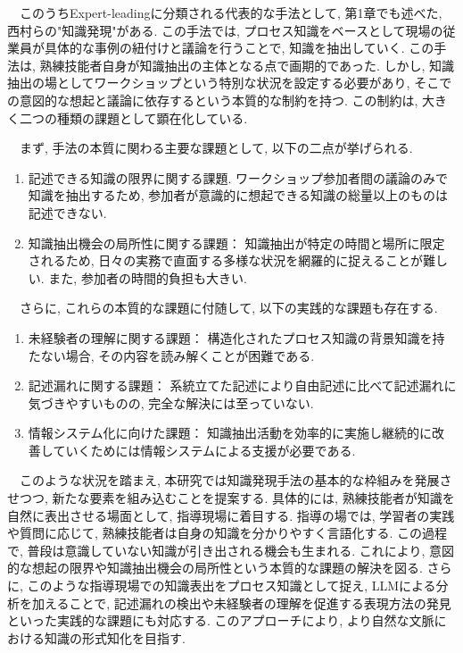 　このうちExpert-leadingに分類される代表的な手法として, 第1章でも述べた, 西村らの"知識発現"\cite{Nishimura2017}がある. この手法では, プロセス知識をベースとして現場の従業員が具体的な事例の紐付けと議論を行うことで, 知識を抽出していく. この手法は, 熟練技能者自身が知識抽出の主体となる点で画期的であった. しかし, 知識抽出の場としてワークショップという特別な状況を設定する必要があり, そこでの意図的な想起と議論に依存するという本質的な制約を持つ. この制約は, 大きく二つの種類の課題として顕在化している. 

　まず, 手法の本質に関わる主要な課題として, 以下の二点が挙げられる.

\begin{enumerate}
    \item 記述できる知識の限界に関する課題.
    ワークショップ参加者間の議論のみで知識を抽出するため, 参加者が意識的に想起できる知識の総量以上のものは記述できない. 
    
    \item 知識抽出機会の局所性に関する課題：
    知識抽出が特定の時間と場所に限定されるため, 日々の実務で直面する多様な状況を網羅的に捉えることが難しい. また, 参加者の時間的負担も大きい.
\end{enumerate}

　さらに, これらの本質的な課題に付随して, 以下の実践的な課題も存在する.

\begin{enumerate}
    \item 未経験者の理解に関する課題：
    構造化されたプロセス知識の背景知識を持たない場合, その内容を読み解くことが困難である. 
    
    \item 記述漏れに関する課題：
    系統立てた記述により自由記述に比べて記述漏れに気づきやすいものの, 完全な解決には至っていない. 
    
    \item 情報システム化に向けた課題：
    知識抽出活動を効率的に実施し継続的に改善していくためには情報システムによる支援が必要である. 
\end{enumerate}

　このような状況を踏まえ, 本研究では知識発現手法の基本的な枠組みを発展させつつ, 新たな要素を組み込むことを提案する. 具体的には, 熟練技能者が知識を自然に表出させる場面として, 指導現場に着目する. 指導の場では, 学習者の実践や質問に応じて, 熟練技能者は自身の知識を分かりやすく言語化する. この過程で, 普段は意識していない知識が引き出される機会も生まれる. これにより, 意図的な想起の限界や知識抽出機会の局所性という本質的な課題の解決を図る. さらに, このような指導現場での知識表出をプロセス知識として捉え, LLMによる分析を加えることで, 記述漏れの検出や未経験者の理解を促進する表現方法の発見といった実践的な課題にも対応する. このアプローチにより, より自然な文脈における知識の形式知化を目指す.\\


